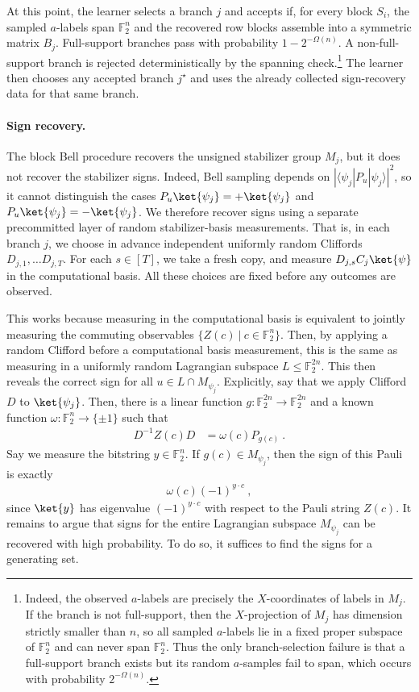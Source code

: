 \documentclass[11pt]{article}
\newcommand{\braketbra}[3]{\langle #1|#2| #3 \rangle}
\newcommand{\F}{\mathbb{F}}
\begin{document}
At this point, the learner selects a branch $j$ and accepts if, for every block $S_i$, the
sampled $a$-labels span $\F_2^n$ and the recovered row blocks assemble into a symmetric matrix $B_j$.  Full-support branches pass with probability $1-2^{-\Omega(n)}$. A non-full-support branch is rejected deterministically by the spanning check.\footnote{
Indeed, the observed $a$-labels are precisely the $X$-coordinates of labels in $M_j$.  If the branch is not full-support, then the $X$-projection of $M_j$ has
dimension strictly smaller than $n$, so all sampled $a$-labels lie in a fixed proper subspace of $\F_2^n$ and can never span $\F_2^n$.  Thus the only
branch-selection failure is that a full-support branch exists but its random $a$-samples fail to span, which occurs with probability $2^{-\Omega(n)}$.}  The learner then chooses any accepted branch $j^\star$ and uses the already collected sign-recovery data for that same branch.
\paragraph{Sign recovery.} The block Bell procedure recovers the unsigned stabilizer group $M_j$, but it
does not recover the stabilizer signs.  Indeed, Bell sampling depends on
$|\braketbra{\psi_j}{P_u}{\psi_j}|^2$, so it cannot distinguish the cases
$P_u\ket{\psi_j}=+\ket{\psi_j}$ and
$P_u\ket{\psi_j}=-\ket{\psi_j}$.  We therefore recover signs using a separate
precommitted layer of random stabilizer-basis measurements. That is, in each branch $j$, we choose in advance independent uniformly random Cliffords $D_{j,1},\ldots D_{j,T}$. For each $s \in [T]$, we take a fresh copy, and measure $D_{j,s}C_{j}\ket{\psi}$ in the computational basis. All these choices are fixed before any outcomes are observed.

This works because measuring in the computational basis is equivalent to jointly measuring the commuting observables $\{Z(c) \ \vert  \ c\in \F_{2}^{n}\}$. Then, by applying a random Clifford before a computational basis measurement, this is the same as measuring in a uniformly random Lagrangian subspace $L \leq \F_2^{2n}$. This then reveals the correct sign for all $u \in L \cap M_{\psi_j}$. Explicitly, say that we apply Clifford $D$ to $\ket{\psi_j}$. Then, there is a linear function $g:\F_2^{2n}\rightarrow \F_2^{2n}$ and a known function $\omega:\F_2^{n}\rightarrow \{\pm 1\}$ such that
\begin{align}
    D^{-1}Z(c) D & = \omega(c) P_{g(c)}\ .
\end{align}
Say we measure the bitstring $y\in \F_2^n$. If $g(c) \in M_{\psi_j}$, then the sign of this Pauli is exactly
\begin{align}
    \omega(c)(-1)^{y\cdot c}\ ,
\end{align}
since $\ket{y}$ has eigenvalue $(-1)^{y\cdot c}$ with respect to the Pauli string $Z(c)$. It remains to argue that signs for the entire Lagrangian subspace $M_{\psi_j}$ can be recovered with high probability. To do so, it suffices to find the signs for a generating set.
\end{document}
